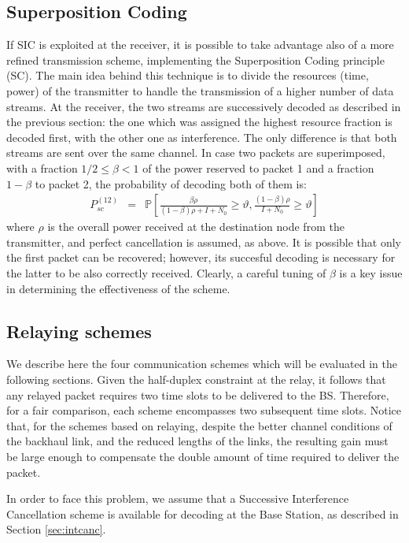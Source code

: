 \documentclass[12pt, letterpaper, onecolumn, draftcls]{IEEEtran}
\begin{document}
\subsection{Superposition Coding}
If SIC is exploited at the receiver, it is possible to take advantage also of a more refined transmission scheme, implementing the Superposition Coding principle (SC). The main idea behind this technique is to divide the resources (time, power) of the transmitter to handle the transmission of a higher number of data streams.
At the receiver, the two streams are successively decoded as described in the previous section: the one which was assigned the highest resource fraction is decoded first, with the other one as interference. The only difference is that both streams are sent over the same channel. In case two packets are superimposed, with a fraction $1/2\leq\beta<1$ of the power reserved to packet 1 and a fraction $1-\beta$ to packet 2, the probability of decoding both of them is:
\begin{eqnarray}
 P_{sc}^{(12)} & = & \mathbb{P}\left[\frac{\beta \rho}{(1-\beta)\rho+I+N_0}\geq\vartheta, \frac{(1-\beta)\rho}{I+N_0}\geq\vartheta\right]
\end{eqnarray}
where $\rho$ is the overall power received at the destination node from the transmitter, and perfect cancellation is assumed, as above. It is possible that only the first packet can be recovered; however, its succesful decoding is necessary for the latter to be also correctly received.
Clearly, a careful tuning of $\beta$ is a key issue in determining the effectiveness of the scheme.

\subsection{Relaying schemes}
We describe here the four communication schemes which will be evaluated in the following sections.
Given the half-duplex constraint at the relay, it follows that any relayed packet requires two time slots to be delivered to the BS.
Therefore, for a fair comparison, each scheme encompasses two subsequent time slots.
Notice that, for the schemes based on relaying, despite the better channel conditions of the backhaul link, and the reduced lengths of the links, the resulting gain must be large enough to compensate the double amount of time required to deliver the packet.

In order to face this problem, we assume that a Successive Interference Cancellation scheme is available for decoding at the Base Station, as described in Section \ref{sec:intcanc}.
\end{document}
